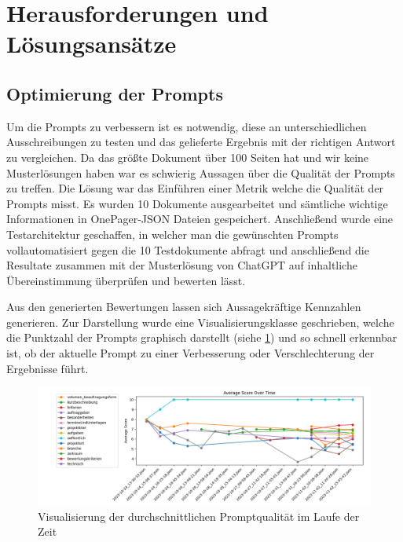 \section{Herausforderungen und Lösungsansätze}

\subsection{Optimierung der Prompts}
Um die Prompts zu verbessern ist es notwendig, diese an unterschiedlichen Ausschreibungen zu testen und das gelieferte
Ergebnis mit der richtigen Antwort zu vergleichen. Da das größte Dokument über 100 Seiten hat und wir keine
Musterlösungen haben war es schwierig Aussagen über die Qualität der Prompts zu treffen. Die Lösung war das Einführen
einer Metrik welche die Qualität der Prompts misst. Es wurden 10 Dokumente ausgearbeitet und sämtliche wichtige
Informationen in OnePager-JSON Dateien gespeichert. Anschließend wurde eine Testarchitektur geschaffen, in welcher man
die gewünschten Prompts vollautomatisiert gegen die 10 Testdokumente abfragt und anschließend die Resultate zusammen mit
der Musterlösung von ChatGPT auf inhaltliche Übereinstimmung überprüfen und bewerten lässt.

Aus den generierten Bewertungen lassen sich Aussagekräftige Kennzahlen generieren. Zur Darstellung wurde eine
Visualisierungsklasse geschrieben, welche die Punktzahl der Prompts graphisch darstellt (siehe
\ref{fig:03_Prompt_Evaluierung}) und so schnell erkennbar ist, ob der aktuelle Prompt zu einer Verbesserung oder
Verschlechterung der Ergebnisse führt.

\begin{figure}[hbt]
    \centering
    \includegraphics[width=1\textwidth]{figures/03_Prompt_Evaluierung.png}
    \caption{Visualisierung der durchschnittlichen Promptqualität im Laufe der Zeit}
    \label{fig:03_Prompt_Evaluierung}    %
\end{figure}


